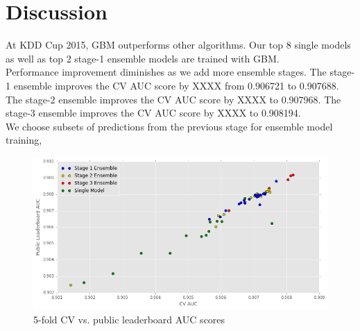 \section{Discussion}
At KDD Cup 2015, GBM outperforms other algorithms.  Our top 8 single models as well as top 2 stage-1 ensemble models are trained with GBM.\\

Performance improvement diminishes as we add more ensemble stages.  The stage-1 ensemble improves the CV AUC score by XXXX from 0.906721 to 0.907688.  The stage-2 ensemble improves the CV AUC score by XXXX to 0.907968.  The stage-3 ensemble improves the CV AUC score by XXXX to 0.908194.\\

We choose subsets of predictions from the previous stage for ensemble model training, 
\begin{figure}[!ht]
  \caption{5-fold CV vs. public leaderboard AUC scores}
  \centering
    \includegraphics[width=0.5 \textwidth]{cv_lb}
\end{figure}

